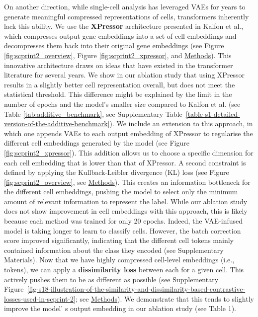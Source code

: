 On another direction, while single-cell analysis has leveraged \gls{VAE}s for
years to generate meaningful compressed representations of cells,
transformers inherently lack this ability\citep{lopezDeepGenerativeModeling2018,moinfartUnsupervisedDeepDisentangled2025,xuProbabilisticHarmonizationAnnotation2021}. We
use the \textbf{XPressor} architecture presented in Kalfon et
al.\citep{kalfonTowardsFoundationModels2025}, which compresses output gene embeddings into a
set of cell embeddings and decompresses them back into their original
gene embeddings (see Figure \ref{fig:scprint2_overview}, Figure \ref{fig:scprint2_xpressor}, and
\hyperref[xpressor-model]{Methods}). This innovative architecture
draws on ideas that have existed in the transformer literature for
several years\citep{jabriScalableAdaptiveComputation2023,jaeglePerceiverIOGeneral2022,jaeglePerceiverGeneralPerception2021,carreiraHiPHierarchicalPerceiver2022,leeNVEmbedImprovedTechniques2025}. We show in our ablation study
that using XPressor results in a slightly better cell representation
overall, but does not meet the statistical threshold. This difference
might be explained by the limit in the number of epochs and the model's
smaller size compared to Kalfon et al. (see Table \ref{tab:additive_benchmark}, see Supplementary Table~\ref{table-s1-detailed-version-of-the-additive-benchmark}). We include an extension to this approach, in which one appends \gls{VAE}s
to each output embedding of XPressor to regularise the different cell
embeddings generated by the model (see Figure \ref{fig:scprint2_xpressor}). This addition allows
us to choose a specific dimension for each cell embedding that is lower
than that of XPressor. A second constraint is defined by applying the
Kullback-Leibler divergence (KL) loss (see Figure \ref{fig:scprint2_overview}, see
\hyperref[vae-based-compressor-model]{Methods}). This creates an
information bottleneck for the different cell embeddings, pushing the
model to select only the minimum amount of relevant information to
represent the label. While our ablation study does not show improvement
in cell embeddings with this approach, this is likely because each
method was trained for only 20 epochs. Indeed, the VAE-infused model is
taking longer to learn to classify cells. However, the batch correction
score improved significantly, indicating that the different cell tokens
mainly contained information about the class they encoded (see Supplementary
Materials). Now that we have highly compressed cell-level embeddings
(i.e., tokens), we can apply a \textbf{dissimilarity loss} between each
for a given cell. This actively pushes them to be as different as
possible (see Supplementary Figure~\ref{fig-s18-illustration-of-the-similarity-and-dissimilarity-based-contrastive-losses-used-in-scprint-2}; see
\hyperref[embedding-independence-loss]{Methods}). We demonstrate
that this tends to slightly improve the model' s output
embedding in our ablation study (see Table 1).

